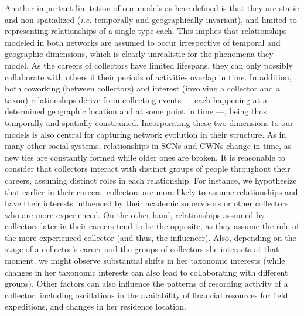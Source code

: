 Another important limitation of our models as here defined is that they are static and non-spatialized (\textit{i.e.} temporally and geographically invariant), and limited to representing relationships of a single type each.
This implies that relationships modeled in both networks are assumed to occur irrespective of temporal and geographic dimensions, which is clearly unrealistic for the phenomena they model.
As the careers of collectors have limited lifespans, they can only possibly collaborate with others if their periods of activities overlap in time.
In addition, both coworking (between collectors) and interest (involving a collector and a taxon) relationships derive from collecting events --- each happening at a determined geographic location and at some point in time ---, being thus temporally and spatially constrained.
Incorporating these two dimensions to our models is also central for capturing network evolution in their structure.
%
As in many other social systems, relationships in SCNs and CWNs change in time, as new ties are constantly formed while older ones are broken.
It is reasonable to consider that collectors interact with distinct groups of people throughout their careers, assuming distinct roles in each relationship.
For instance, we hypothesize that earlier in their careers, collectors are more likely to assume relationships and have their interests influenced by their academic supervisors or other collectors who are more experienced.
On the other hand, relationships assumed by collectors later in their careers tend to be the opposite, as they assume the role of the more experienced collector (and thus, the influencer).
Also, depending on the stage of a collector's career and the groups of collectors she interacts at that moment, we might observe substantial shifts in her taxonomic interests (while changes in her taxonomic interests can also lead to collaborating with different groups).
Other factors can also influence the patterns of recording activity of a collector, including oscillations in the availability of financial resources for field expeditions, and changes in her residence location.


